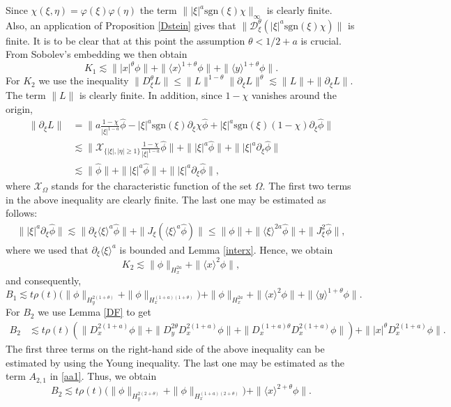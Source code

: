 \documentclass[reqno]{amsart}
\newcommand{\ha}{\hat{\phi}}
\newcommand{\lanx}{\langle x \rangle}
\newcommand{\lany}{\langle y \rangle}
\newcommand{\Dt}{\mathcal{D}^{\theta}_\xi}
\newcommand{\p}{\partial}
\newcommand{\sgn}{\text{sgn}}
\numberwithin{equation}{section}
\begin{document}
Since $\chi(\xi,\eta)=\varphi(\xi)\varphi(\eta)$ the term $\||\xi|^a \sgn(\xi)\chi\|_\infty$ is clearly finite. Also, an application of Proposition \ref{Dstein} gives that $\|\Dt (|\xi|^a \sgn(\xi)\chi)\|$ is finite. It is to be clear that at this point the assumption $\theta<1/2+a$ is crucial. From Sobolev's embedding we then obtain
\begin{equation*}
K_1\lesssim \||x|^\theta \phi\|+\|\lanx^{1+\theta} \phi\|+\|\lany^{1+\theta} \phi\|.
\end{equation*}
For $K_2$ we use the inequality $\|D^\theta_\xi L\|\leq \|L\|^{1-\theta}\|\partial_{\xi} L\|^\theta\lesssim \|L\|+\|\partial_{\xi} L\|$. The term $\|L\|$ is clearly finite. In addition, since $1-\chi$ vanishes around the origin,
\begin{equation*}
\begin{split}
\|\partial_\xi L \| &= \Big \|a\frac{1-\chi}{|\xi|^{1-a}}\ha-|\xi|^{a}\sgn(\xi)\partial_\xi \chi \ha+|\xi|^{a}\sgn(\xi)(1-\chi)\partial_\xi \ha\Big\|\\
&\lesssim \Big\|\mathcal{X}_{\{|\xi|,|\eta|\geq 1\}}\frac{1-\chi}{|\xi|^{1-a}}\ha\Big\|+\||\xi|^a\ha\|+\||\xi|^a \p_\xi \ha\|\\
&\lesssim  \|\ha\|+\||\xi|^a\ha\|+\||\xi|^a \p_\xi \ha\|,
\end{split}
\end{equation*}
where $\mathcal{X}_\Omega$ stands for the characteristic function of the set $\Omega$.
The first two terms in the above inequality are clearly finite. The last one may be estimated as follows: 
\begin{equation*}
\begin{split}
\||\xi|^a \p_\xi \ha\|\lesssim \|\partial_{\xi}\langle\xi\rangle^a\ha\|+\|J_\xi(\langle \xi \rangle^{a}\ha)\|\leq \|\phi\|+\|\langle \xi \rangle^{2a}\ha\|+\|J_\xi^2 \ha\|,
\end{split}
\end{equation*}
where we used that $\partial_{\xi}\langle\xi\rangle^a$ is bounded and Lemma \ref{interx}. Hence, we obtain
$$
K_2\lesssim \|\phi\|_{H^{2a}_x}+\|\lanx^2\phi\|,
$$ 
and consequently,
\begin{equation}\label{B1est}
B_1\lesssim t\rho(t)\Big(\|\phi\|_{H^{2(1+\theta)}_y}+\| \phi\|_{H^{(1+a)(1+\theta)}_x}\Big) +\|\phi\|_{H^{2a}_x}+\|\lanx^2\phi\| +\|\lany^{1+\theta} \phi\|.
\end{equation}
For $B_2$ we use Lemma \ref{DF} to get
\begin{equation*}
\begin{split}
B_2 &\lesssim  t\rho(t) (\|D_x^{2(1+a)}\phi\|+\|D_y^{2\theta} D_x^{2(1+a)}\phi\|+\|D_x^{(1+a)\theta}D_x^{2(1+a)}\phi\|)+
\||x|^\theta D_x^{2(1+a)}\phi\|.
\end{split}
\end{equation*}
The first three terms on the right-hand side of the above inequality can be estimated by using the Young inequality. The last one may be estimated as the term $A_{2,1}$ in \eqref{aa1}. Thus, we obtain
\begin{equation}
B_2\lesssim t\rho(t)\Big(\|\phi\|_{H^{2(2+\theta)}_y}+\| \phi\|_{H^{(1+a)(2+\theta)}_x}\Big)+\|\langle x\rangle^{2+\theta}\phi\|.
\end{equation}
\end{document}
